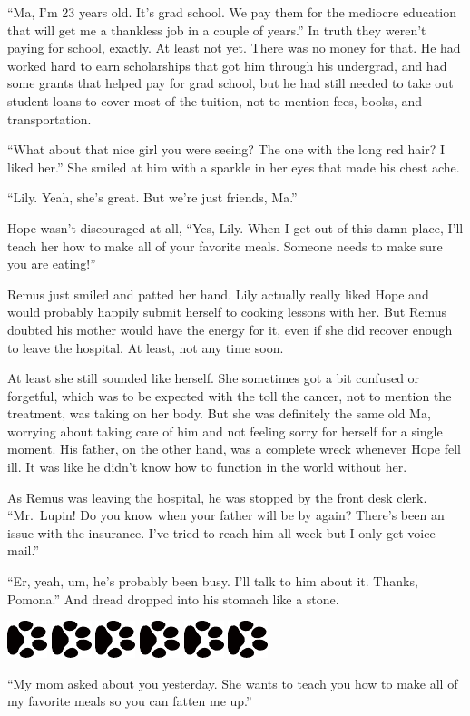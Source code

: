 \documentclass[12pt,twoside,openright]{memoir}
\newcommand{\myrulez}{	
	\begin{center}
		\hspace{.5em}
		\includegraphics[angle=60]{dogprint.pdf}
		\hspace{.5em}
		\includegraphics[angle=120]{dogprint.pdf}
		\hspace{.5em}
		\includegraphics[angle=60]{dogprint.pdf}
		\hspace{.5em}
		\includegraphics[angle=120]{dogprint.pdf}
		\hspace{.5em}
		\includegraphics[angle=60]{dogprint.pdf}
		\hspace{.5em}
		\includegraphics[angle=120]{dogprint.pdf}
		\hspace{.5em}
	\end{center}
}
\begin{document}
``Ma, I'm 23 years old. It's grad school. We pay them for the mediocre education that will get me a thankless job in a couple of years.'' In truth they weren't paying for school, exactly. At least not yet. There was no money for that. He had worked hard to earn scholarships that got him through his undergrad, and had some grants that helped pay for grad school, but he had still needed to take out student loans to cover most of the tuition, not to mention fees, books, and transportation. 

``What about that nice girl you were seeing? The one with the long red hair? I liked her.'' She smiled at him with a sparkle in her eyes that made his chest ache. 

``Lily. Yeah, she's great. But we're just friends, Ma.'' 

Hope wasn't discouraged at all, ``Yes, Lily. When I get out of this damn place, I'll teach her how to make all of your favorite meals. Someone needs to make sure you are eating!'' 

Remus just smiled and patted her hand. Lily actually really liked Hope and would probably happily submit herself to cooking lessons with her. But Remus doubted his mother would have the energy for it, even if she did recover enough to leave the hospital. At least, not any time soon.

At least she still sounded like herself. She sometimes got a bit confused or forgetful, which was to be expected with the toll the cancer, not to mention the treatment, was taking on her body. But she was definitely the same old Ma, worrying about taking care of him and not feeling sorry for herself for a single moment. His father, on the other hand, was a complete wreck whenever Hope fell ill. It was like he didn't know how to function in the world without her. 

As Remus was leaving the hospital, he was stopped by the front desk clerk. ``Mr.\ Lupin! Do you know when your father will be by again? There's been an issue with the insurance. I've tried to reach him all week but I only get voice mail.''

``Er, yeah, um, he's probably been busy. I'll talk to him about it. Thanks, Pomona.'' And dread dropped into his stomach like a stone. 

\myrulez

``My mom asked about you yesterday. She wants to teach you how to make all of my favorite meals so you can fatten me up.''
\end{document}
